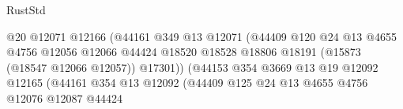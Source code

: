 \begin{lexlean}{RustStd}
\begin{coremodule}
                                                    @20
                                                    @12071
                                                    @12166
                                                    (@44161
                                                      @349
                                                      @13
                                                      @12071
                                                      (@44409
                                                        @120
                                                        @24
                                                        @13
                                                        @4655
                                                        @4756
                                                        @12056
                                                        @12066
                                                        @44424
                                                        @18520
                                                        @18528
                                                        @18806
                                                        @18191
                                                        (@15873 (@18547 @12066 @12057))
                                                        @17301))
                                                    (@44153
                                                      @354
                                                      @3669
                                                      @13
                                                      @19
                                                      @12092
                                                      @12165
                                                      (@44161
                                                        @354
                                                        @13
                                                        @12092
                                                        (@44409
                                                          @125
                                                          @24
                                                          @13
                                                          @4655
                                                          @4756
                                                          @12076
                                                          @12087
                                                          @44424

\end{coremodule}
\end{lexlean}
